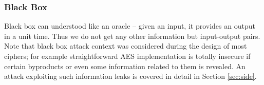 \subsubsection{Black Box}

Black box can understood like an oracle -- given an input, it provides an output in a unit time. Thus we do not get any other information but input-output pairs. Note that black box attack context was considered during the design of most ciphers; for example straightforward AES implementation is totally insecure if certain byproducts or even some information related to them is revealed. An attack exploiting such information leaks is covered in detail in Section \ref{sec:side}.







\begin{defn}
	
\end{defn}

\begin{defn}
	
\end{defn}





	






